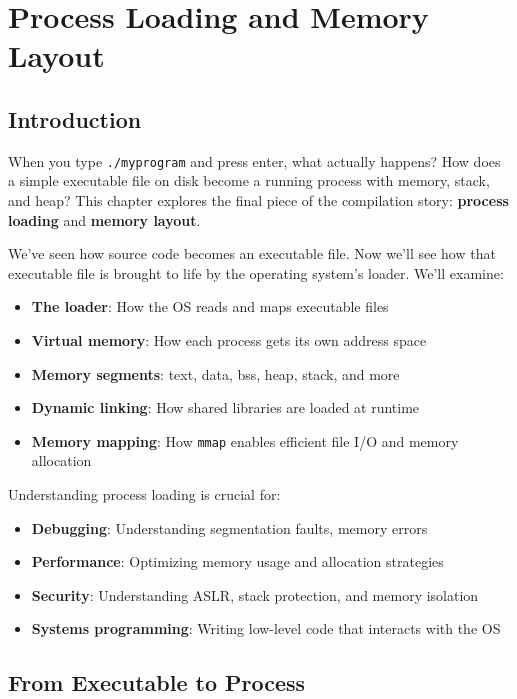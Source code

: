\chapter{Process Loading and Memory Layout}

\section{Introduction}

When you type \texttt{./myprogram} and press enter, what actually happens? How does a simple executable file on disk become a running process with memory, stack, and heap? This chapter explores the final piece of the compilation story: \textbf{process loading} and \textbf{memory layout}.

We've seen how source code becomes an executable file. Now we'll see how that executable file is brought to life by the operating system's loader. We'll examine:
\begin{itemize}
    \item \textbf{The loader}: How the OS reads and maps executable files
    \item \textbf{Virtual memory}: How each process gets its own address space
    \item \textbf{Memory segments}: text, data, bss, heap, stack, and more
    \item \textbf{Dynamic linking}: How shared libraries are loaded at runtime
    \item \textbf{Memory mapping}: How \texttt{mmap} enables efficient file I/O and memory allocation
\end{itemize}

Understanding process loading is crucial for:
\begin{itemize}
    \item \textbf{Debugging}: Understanding segmentation faults, memory errors
    \item \textbf{Performance}: Optimizing memory usage and allocation strategies
    \item \textbf{Security}: Understanding ASLR, stack protection, and memory isolation
    \item \textbf{Systems programming}: Writing low-level code that interacts with the OS
\end{itemize}

\section{From Executable to Process}

